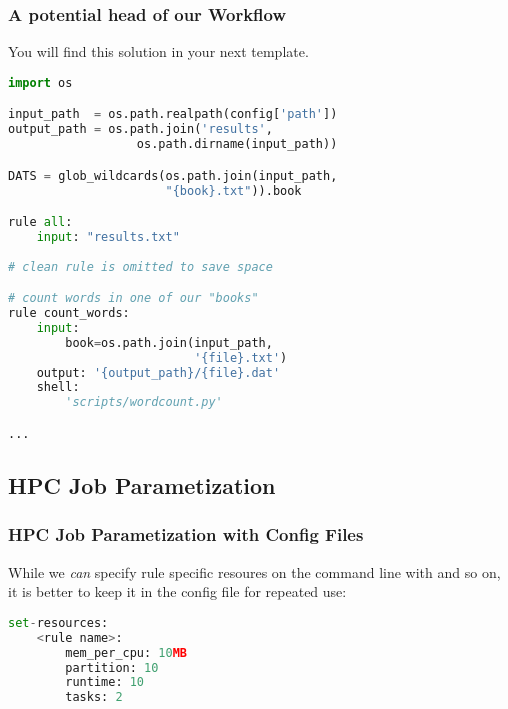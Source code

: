 \begin{frame}[fragile]
  \frametitle{A potential head of our Workflow}
  You will find this solution in your next template.
  \begin{lstlisting}[language=Python,style=Python, basicstyle=\small]
import os

input_path  = os.path.realpath(config['path'])
output_path = os.path.join('results', 
                  os.path.dirname(input_path))

DATS = glob_wildcards(os.path.join(input_path, 
                      "{book}.txt")).book

rule all:
    input: "results.txt"
    
# clean rule is omitted to save space

# count words in one of our "books"
rule count_words:
    input:
        book=os.path.join(input_path,
                          '{file}.txt')
    output: '{output_path}/{file}.dat'
    shell:  
        'scripts/wordcount.py'

...
  \end{lstlisting}
\end{frame}

\subsection{HPC Job Parametization}

\begin{frame}[fragile]
  \frametitle{HPC Job Parametization with Config Files}
  While we \emph{can} specify rule specific resoures on the command line with  and so on, it is better to keep it in the config file for repeated use:
  \begin{lstlisting}[language=Python,style=Python]
set-resources:
    <rule name>:
        mem_per_cpu: 10MB
        partition: 10
        runtime: 10
        tasks: 2
  \end{lstlisting}
\end{frame}

